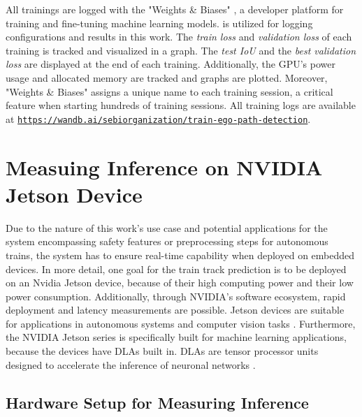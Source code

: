 
All trainings are logged with the "Weights \& Biases" \cite{wandb}, a developer platform for training and ﬁne-tuning machine learning models.
\cite{wandb} is utilized for logging conﬁgurations and results in this work.
The \textit{train loss} and \textit{validation loss} of each training is tracked and visualized in a graph.
The \textit{test \ac{IoU}} and the \textit{best validation loss} are displayed at the end of each training.
Additionally, the \ac{GPU}'s power usage and allocated memory are tracked and graphs are plotted.
Moreover, "Weights \& Biases" \cite{wandb} assigns a unique name to each training session, a critical feature when starting hundreds of training sessions.
All training logs are available at \href{https://wandb.ai/sebiorganization/train-ego-path-detection}{\texttt{https://wandb.ai/sebiorganization/train-ego-path-detection}}.


\section{Measuing Inference on NVIDIA Jetson Device}

Due to the nature of this work's use case and potential applications for the system encompassing safety features or preprocessing steps for autonomous trains, the system has to ensure real-time capability when deployed on embedded devices. 
In more detail, one goal for the train track prediction is to be deployed on an Nvidia Jetson device, because of their high computing power and their low power consumption.
Additionally, through NVIDIA's software ecosystem, rapid deployment and latency measurements are possible.
Jetson devices are suitable for applications in autonomous systems and computer vision tasks \cite{nvidia_jetson_embedded_devices}.
Furthermore, the NVIDIA Jetson series is specifically built for machine learning applications, because the devices have \ac{DLA}s built in.
\ac{DLA}s are tensor processor units designed to accelerate the inference of neuronal networks \cite{nvidia_dlas}.

\subsection{Hardware Setup for Measuring Inference}

